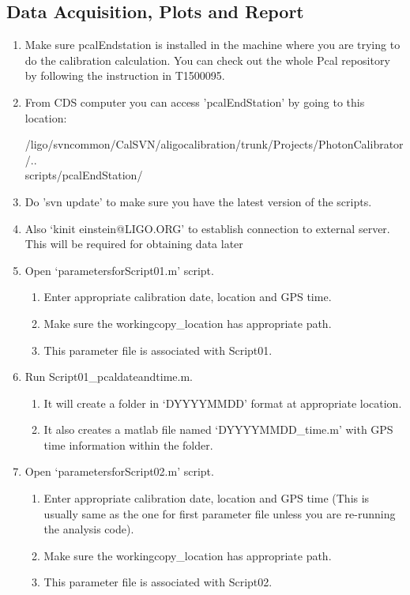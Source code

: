 \subsection{Data Acquisition, Plots and Report}
\begin{enumerate}
\item Make sure pcalEndstation is installed in the machine where you are trying to do the calibration calculation. You can check out the whole Pcal repository by following the instruction in T1500095.
\item From CDS computer you can access 'pcalEndStation' by going to this location:

/ligo/svncommon/CalSVN/aligocalibration/trunk/Projects/PhotonCalibrator/.. \\ scripts/pcalEndStation/
\item Do 'svn update' to make sure you have the latest version of the scripts.
\item Also `kinit einstein@LIGO.ORG' to establish connection to external server. This will be required for obtaining data later
\item Open ‘parametersforScript01.m’ script. 
\begin{enumerate}
\item Enter appropriate calibration date, location and GPS time. 
\item Make sure the workingcopy\_location has appropriate path.  
\item This parameter file is associated with Script01.
\end{enumerate}

\item Run Script01\_pcaldateandtime.m. 

\begin{enumerate}
\item It will create a folder in ‘DYYYYMMDD’ format at appropriate location.
\item It also creates a matlab file named ‘DYYYYMMDD\_time.m’ with GPS time information within the folder.
\end{enumerate}

\item Open ‘parametersforScript02.m’ script. 
\begin{enumerate}
\item Enter appropriate calibration date, location and GPS time (This is usually same as the one for first parameter file unless you are re-running the analysis code). 
\item Make sure the workingcopy\_location has appropriate path.  
\item This parameter file is associated with Script02.
\end{enumerate}


\end{enumerate}
